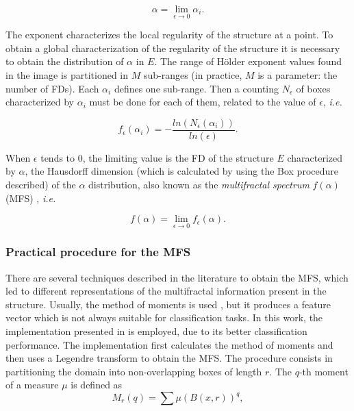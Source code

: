 \documentclass[a4paper,10pt]{article}
\begin{document}
\begin{equation}
\alpha = \lim_{\epsilon\to0}{\alpha_{i}}.
\label{eqn:eqn5}
\end{equation}

The exponent characterizes the local regularity of the structure at a point. To obtain a global characterization of the regularity of the structure it is necessary to obtain the distribution of $\alpha$ in $E$. The range of H\"older exponent values found in the image is partitioned in $M$ sub-ranges (in practice, $M$ is a parameter: the number of FDs). Each $\alpha_{i}$ defines one sub-range. Then a counting $N_{\epsilon}$ of boxes characterized by $\alpha_{i}$ must be done for each of them, related to the value of $\epsilon$, {\em i.e.}

\begin{equation}
f_{\epsilon}(\alpha_{i}) = - \frac{ln(N_{\epsilon}(\alpha_{i}))}{ln(\epsilon)}.
\label{eqn:eqn6}
\end{equation}

When $\epsilon$ tends to $0$, the limiting value is the FD of the structure $E$ characterized by $\alpha$, the Hausdorff dimension (which is calculated by using the Box procedure described) of the $\alpha$ distribution, also known as the {\em multifractal spectrum} $f(\alpha)$ (MFS) \cite{Silvetti2010}, {\em i.e.}

\begin{equation}
f(\alpha) = \lim_{\epsilon\to0}{f_{\epsilon}(\alpha)}.
\label{eqn:eqn7}
\end{equation}

\subsubsection{Practical procedure for the MFS}
There are several techniques described in the literature to obtain the MFS, which led to different representations of the multifractal information present in the structure. Usually, the method of moments is used \cite{Mendoza2010,Serrano2012}, but it produces a feature vector which is not always suitable for classification tasks. In this work, the implementation presented in \cite{Xu2006} is employed, due to its better classification performance. The implementation first calculates the method of moments and then uses a Legendre transform to obtain the MFS. The procedure consists in partitioning the domain into non-overlapping boxes of length $r$. The $q$-th moment of a measure $\mu$ is defined as
\begin{equation}
M_{r}(q) = \sum{\mu(B(x,r))^{q}},
\label{eqn:eqn8}
\end{equation}
\end{document}
